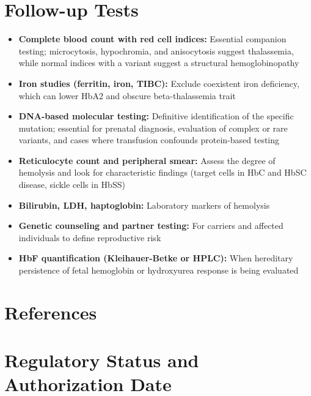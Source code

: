 \section*{Follow-up Tests}
\begin{itemize}
  \item \textbf{Complete blood count with red cell indices:} Essential companion testing; microcytosis, hypochromia, and anisocytosis suggest thalassemia, while normal indices with a variant suggest a structural hemoglobinopathy
  \item \textbf{Iron studies (ferritin, iron, TIBC):} Exclude coexistent iron deficiency, which can lower HbA2 and obscure beta-thalassemia trait
  \item \textbf{DNA-based molecular testing:} Definitive identification of the specific mutation; essential for prenatal diagnosis, evaluation of complex or rare variants, and cases where transfusion confounds protein-based testing
  \item \textbf{Reticulocyte count and peripheral smear:} Assess the degree of hemolysis and look for characteristic findings (target cells in HbC and HbSC disease, sickle cells in HbSS)
  \item \textbf{Bilirubin, LDH, haptoglobin:} Laboratory markers of hemolysis
  \item \textbf{Genetic counseling and partner testing:} For carriers and affected individuals to define reproductive risk
  \item \textbf{HbF quantification (Kleihauer-Betke or HPLC):} When hereditary persistence of fetal hemoglobin or hydroxyurea response is being evaluated
\end{itemize}

\section*{References}



\clearpage
\section*{Regulatory Status and Authorization Date}

\clearpage
